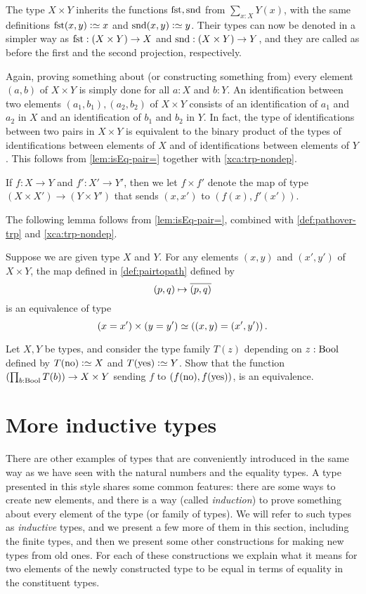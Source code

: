 The type $X \times Y$ inherits the functions $\fst,\snd$ from
$\sum_{x:X} Y(x)$, with the same definitions $\fst(x,y)\defeq x$
and $\snd(x,y)\defeq y$. Their types can now be denoted in a
simpler way as $\fst: (X \times Y)\to X$ and
$\snd: (X \times Y)\to Y$, and they are called as before the
first and the second projection, respectively.

Again, proving something about (or constructing something from) every
element $(a,b)$ of $X \times Y$ is simply done for all $a:X$ and $b:Y$.
An identification between two elements $(a_1,b_1),(a_2,b_2)$ of
$X \times Y$ consists of an identification of $a_1$ and $a_2$ in $X$
and an identification of $b_1$ and $b_2$ in $Y$. In fact, the type of identifications between two pairs in $X \times Y$
is equivalent to the binary product of the types of identifications between
elements of $X$ and of identifications between elements of $Y$.
This follows from \cref{lem:isEq-pair=} together with
\cref{xca:trp-nondep}.

If $f: X \to Y$ and $f': X' \to Y'$, then we let
$f\times f'$ denote the map of type $(X\times X') \to (Y\times Y')$
that sends $(x,x')$ to $(f(x),f'(x'))$.

The following lemma follows from \cref{lem:isEq-pair=}, combined with \cref{def:pathover-trp} and \cref{xca:trp-nondep}.

\begin{lemma}\label{lem:isEq-pair-bin=}
  Suppose we are given type $X$ and $Y$.
  For any elements $(x,y)$ and $(x',y')$ of $X \times Y$,
  the map defined in \cref{def:pairtopath} defined by
  \[
    (p,q) \mapsto \overline{({p},{q})}
  \]
  is an equivalence of type
  \[
    ( x = x' ) \times (y = y') \simeq \left( (x,y) = (x',y') \right).
  \]
\end{lemma}

\begin{xca}\label{xca:binary-prod-equiv}
  Let $X,Y$ be types, and consider the type family
  $T(z)$ depending on $z:\mathrm{Bool}$ defined by
  $T(\no)\defeq X$ and $T(\yes) \defeq Y$.
  Show that the function $(\prod_{b:\mathrm{Bool}}T(b))\to X\times Y$
  sending $f$ to $(f(\mathrm{no}),f(\mathrm{yes}))$, is an equivalence.
\end{xca}

\section{More inductive types}
\label{sec:inductive-types}

There are other examples of types that are conveniently introduced
in the same way as we have seen with the natural numbers and the equality types.
A type
presented in this style shares some common features: there are some ways to create new elements, and there is a way (called \emph{induction}) to
prove something about every element of the type (or family of types).  We will refer to such types as \emph{inductive} types, and we present a
few more of them in this section, including the finite types, and then we present some other constructions for making new types from old ones.
For each of these constructions we explain what it means for two elements of the newly constructed type to be equal in terms of equality in the
constituent types.

